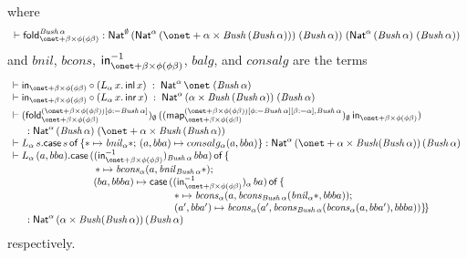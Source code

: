 \documentclass{lmcs}
\theoremstyle{plain}\newtheorem{satz}[thm]{Satz}
\newcommand{\inl}{\mathsf{inl}}
\newcommand{\inr}{\mathsf{inr}}
\newcommand{\fold}{\mathsf{fold}}
\newcommand{\ininv}[2]{(\tin^{-1}_{\onet +
  \beta \times \phi (\phi\beta)})_{#1}\, #2}
\newcommand{\map}{\mathsf{map}}
\begin{document}
where
\[\begin{array}{lll}
\vdash \fold_{\onet + \beta \times \phi
  (\phi\beta)}^{\mathit{Bush}\,\alpha} : \Nat^{\emptyset}\, (\Nat^{\alpha}\, 
(\onet + \alpha \times \mathit{Bush}\, (\mathit{Bush}\, \alpha))) \;
(\mathit{Bush}\,\alpha))\; (\Nat^{\alpha} \,(\mathit{Bush}\,\alpha) \;
(\mathit{Bush}\,\alpha))\\
\end{array}\]
and $\mathit{bnil}$, $\mathit{bcons}$, $\tin^{-1}_{\onet + \beta
  \times \phi (\phi\beta)}$, $\mathit{balg}$, and $\mathit{consalg}$
are the terms
\[\begin{array}{l}
\vdash \tin_{\onet + \beta \times \phi (\phi\beta)} \circ (
L_{\alpha}\, x.\, \inl\, x) \; : \; \Nat^{\alpha}\, \onet\;
(\mathit{Bush}\,\alpha)\\ 
\vdash \tin_{\onet + \beta \times \phi (\phi\beta)} \circ (
L_{\alpha}\, x.\, \inr\, x ) \; : \; \Nat^{\alpha}\, (\alpha \times
\mathit{Bush}\,(\mathit{Bush}\,\alpha))\; (\mathit{Bush}\,\alpha)\\[0.05in]
\vdash (\fold_{\onet + \beta \times \phi (\phi\beta)}^{(\onet + \beta
  \times \phi (\phi\beta))[\phi := \mathit{Bush}\,\alpha]})_\emptyset\,
((\map_{\onet + \beta \times \phi (\phi\beta)}^{(\onet + \beta \times
  \phi (\phi\beta))[\phi := \mathit{Bush}\,\alpha][\beta := \alpha],
  \mathit{Bush}\,\alpha})_\emptyset\, \tin_{\onet + \beta \times \phi
  (\phi\beta)})\\[0.05in]
\hspace*{0.2in} : \Nat^{\alpha}\, (\mathit{Bush}\,\alpha)\; (\onet +
\alpha \times \mathit{Bush}\,(\mathit{Bush}\,\alpha))\\ 
  \vdash L_{\alpha} \, s. 
  \cse{s}{* \mapsto \mathit{bnil}_\alpha *}{(a, bba) \mapsto consalg_\alpha (a, bba)}
  : \Nat^\alpha \, (\onet + \alpha \times \mathit{Bush} (\mathit{Bush} \,\alpha)) \, (\mathit{Bush}\,\alpha) \\
  \vdash L_{\alpha} \, (a, bba).  
  \mathsf{case}\, (\ininv{\mathit{Bush}\,\alpha}{bba})\, \mathsf{of}\,\{
  \\
  \hspace{8em}\, * \mapsto \mathit{bcons}_{\alpha} (a,\mathit{bnil}_{\mathit{Bush}\,\alpha} *);  \\
  \hspace{8em} (ba, bbba) \mapsto \mathsf{case}\, (\ininv{\alpha}{ba})
  \, \mathsf{of}\,\{  \\ 
  \hspace{16em}* \mapsto \mathit{bcons}_\alpha (a, \mathit{bcons}_{\mathit{Bush}\,\alpha} 
        (\mathit{bnil}_\alpha *, bbba)) ;  \\ 
  \hspace{16em}(a', bba') \mapsto \mathit{bcons}_\alpha (a', \mathit{bcons}_{\mathit{Bush}\,\alpha}
  (\mathit{bcons}_\alpha (a, bba'), bbba)) \} \! \}\\    
\hspace*{0.2in} : \Nat^\alpha \, (\alpha \times \mathit{Bush} (\mathit{Bush} \,\alpha)) \, (\mathit{Bush}\,\alpha) \\
\end{array}\]
respectively. 
\end{document}

